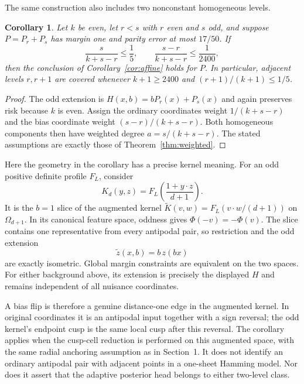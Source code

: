 \documentclass[11pt]{article}
\newtheorem{corollary}[theorem]{Corollary}
\newcommand{\1}{\mathbf 1}
\begin{document}
The same construction also includes two nonconstant homogeneous levels.
\begin{corollary}\label{cor:two-level}
Let $k$ be even, let $r<s$ with $r$ even and $s$ odd, and suppose
$P=P_r+P_s$ has margin one and parity error at most $17/50$.
If
\[
 \frac{s}{k+s-r}\le\frac15,
 \qquad \frac{s-r}{k+s-r}\le\frac1{2400},
\]
then the conclusion of Corollary~\ref{cor:affine} holds for $P$.
In particular, adjacent levels $r,r+1$ are covered whenever
$k+1\ge2400$ and $(r+1)/(k+1)\le1/5$.
\end{corollary}
\begin{proof}
The odd extension is $H(x,b)=bP_r(x)+P_s(x)$ and again preserves
risk because $k$ is even. Assign the ordinary coordinates weight
$1/(k+s-r)$ and the bias coordinate weight $(s-r)/(k+s-r)$.
Both homogeneous components then have weighted degree
$a=s/(k+s-r)$. The stated assumptions are exactly those of
Theorem~\ref{thm:weighted}.
\end{proof}

Here the geometry in the corollary has a precise kernel meaning.
For an odd positive definite profile $F_L$, consider
\[
 K_d(y,z)=F_L\!\left(\frac{1+y\cdot z}{d+1}\right).
\]
It is the $b=1$ slice of the augmented kernel
$\widetilde K(v,w)=F_L(v\cdot w/(d+1))$ on $\Omega_{d+1}$.
In its canonical feature space, oddness gives
$\Phi(-v)=-\Phi(v)$. The slice contains one representative from every
antipodal pair, so restriction and the odd extension
\[
 \widetilde z(x,b)=b\,z(bx)
\]
are exactly isometric. Global margin constraints are equivalent on the
two spaces. For either background above, its extension is precisely the displayed
$H$ and remains independent of all nuisance coordinates.

A bias flip is therefore a genuine distance-one edge in the augmented
kernel. In original coordinates it is an antipodal input together with
a sign reversal; the odd kernel's endpoint cusp is the same local cusp
after this reversal. The corollary applies when the cusp-cell reduction
is performed on this augmented space, with the same radial anchoring
assumption as in Section~1. It does not identify an ordinary antipodal
pair with adjacent points in a one-sheet Hamming model. Nor does it
assert that the adaptive posterior head belongs to either two-level class.
\end{document}
